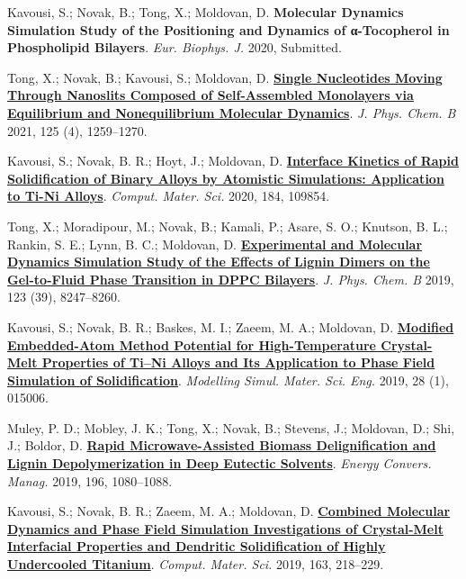 \pagebreak


\begin{cventries}
  \cventry
    {} %
    {} %
    {} %
    {} %
    {
      \begin{cvitems} %
        \item {Kavousi, S.; Novak, B.; Tong, X.; Moldovan, D. \textbf{Molecular Dynamics Simulation Study of the Positioning and Dynamics of α-Tocopherol in Phospholipid Bilayers}. \textit{Eur. Biophys. J.} 2020, Submitted.}
        \item {Tong, X.; Novak, B.; Kavousi, S.; Moldovan, D. \href{https://doi.org/10.1021/acs.jpcb.0c07797}{\textbf{Single Nucleotides Moving Through Nanoslits Composed of Self-Assembled Monolayers via Equilibrium and Nonequilibrium Molecular Dynamics}}. \textit{J. Phys. Chem. B} 2021, 125 (4), 1259–1270.}
        \item {Kavousi, S.; Novak, B. R.; Hoyt, J.; Moldovan, D. \href{https://doi.org/10.1016/j.commatsci.2020.109854.}{\textbf{Interface Kinetics of Rapid Solidification of Binary Alloys by Atomistic Simulations: Application to Ti-Ni Alloys}}. \textit{Comput. Mater. Sci.} 2020, 184, 109854.}
        \item {Tong, X.; Moradipour, M.; Novak, B.; Kamali, P.; Asare, S. O.; Knutson, B. L.; Rankin, S. E.; Lynn, B. C.; Moldovan, D. \href{https://doi.org/10.1021/acs.jpcb.9b05525}{\textbf{Experimental and Molecular Dynamics Simulation Study of the Effects of Lignin Dimers on the Gel-to-Fluid Phase Transition in DPPC Bilayers}}. \textit{J. Phys. Chem. B} 2019, 123 (39), 8247–8260.}
        \item {Kavousi, S.; Novak, B. R.; Baskes, M. I.; Zaeem, M. A.; Moldovan, D. \href{https://doi.org/10.1088/1361-651X/ab580c}{\textbf{Modified Embedded-Atom Method Potential for High-Temperature Crystal-Melt Properties of Ti–Ni Alloys and Its Application to Phase Field Simulation of Solidification}}. \textit{Modelling Simul. Mater. Sci. Eng.} 2019, 28 (1), 015006.}
        \item {Muley, P. D.; Mobley, J. K.; Tong, X.; Novak, B.; Stevens, J.; Moldovan, D.; Shi, J.; Boldor, D. \href{https://doi.org/10.1016/j.enconman.2019.06.070}{\textbf{Rapid Microwave-Assisted Biomass Delignification and Lignin Depolymerization in Deep Eutectic Solvents}}. \textit{Energy Convers. Manag.} 2019, 196, 1080–1088.}
        \item {Kavousi, S.; Novak, B. R.; Zaeem, M. A.; Moldovan, D. \href{https://doi.org/10.1016/j.commatsci.2019.03.024}{\textbf{Combined Molecular Dynamics and Phase Field Simulation Investigations of Crystal-Melt Interfacial Properties and Dendritic Solidification of Highly Undercooled Titanium}}. \textit{Comput. Mater. Sci.} 2019, 163, 218–229.}

\end{cvitems}}
\end{cventries}
